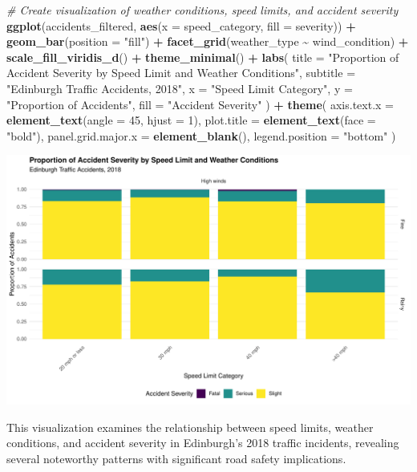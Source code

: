 \documentclass[
]{article}
\newenvironment{Shaded}{\begin{snugshade}}{\end{snugshade}}
\newcommand{\AttributeTok}[1]{\textcolor[rgb]{0.13,0.29,0.53}{#1}}
\newcommand{\CommentTok}[1]{\textcolor[rgb]{0.56,0.35,0.01}{\textit{#1}}}
\newcommand{\DecValTok}[1]{\textcolor[rgb]{0.00,0.00,0.81}{#1}}
\newcommand{\FunctionTok}[1]{\textcolor[rgb]{0.13,0.29,0.53}{\textbf{#1}}}
\newcommand{\NormalTok}[1]{#1}
\newcommand{\SpecialCharTok}[1]{\textcolor[rgb]{0.81,0.36,0.00}{\textbf{#1}}}
\newcommand{\StringTok}[1]{\textcolor[rgb]{0.31,0.60,0.02}{#1}}
\begin{document}
\begin{Shaded}
\begin{Highlighting}[]
\CommentTok{\# Create visualization of weather conditions, speed limits, and accident severity}
\FunctionTok{ggplot}\NormalTok{(accidents\_filtered, }\FunctionTok{aes}\NormalTok{(}\AttributeTok{x =}\NormalTok{ speed\_category, }\AttributeTok{fill =}\NormalTok{ severity)) }\SpecialCharTok{+}
  \FunctionTok{geom\_bar}\NormalTok{(}\AttributeTok{position =} \StringTok{"fill"}\NormalTok{) }\SpecialCharTok{+}
  \FunctionTok{facet\_grid}\NormalTok{(weather\_type }\SpecialCharTok{\textasciitilde{}}\NormalTok{ wind\_condition) }\SpecialCharTok{+}
  \FunctionTok{scale\_fill\_viridis\_d}\NormalTok{() }\SpecialCharTok{+}
  \FunctionTok{theme\_minimal}\NormalTok{() }\SpecialCharTok{+}
  \FunctionTok{labs}\NormalTok{(}
    \AttributeTok{title =} \StringTok{"Proportion of Accident Severity by Speed Limit and Weather Conditions"}\NormalTok{,}
    \AttributeTok{subtitle =} \StringTok{"Edinburgh Traffic Accidents, 2018"}\NormalTok{,}
    \AttributeTok{x =} \StringTok{"Speed Limit Category"}\NormalTok{,}
    \AttributeTok{y =} \StringTok{"Proportion of Accidents"}\NormalTok{,}
    \AttributeTok{fill =} \StringTok{"Accident Severity"}
\NormalTok{  ) }\SpecialCharTok{+}
  \FunctionTok{theme}\NormalTok{(}
    \AttributeTok{axis.text.x =} \FunctionTok{element\_text}\NormalTok{(}\AttributeTok{angle =} \DecValTok{45}\NormalTok{, }\AttributeTok{hjust =} \DecValTok{1}\NormalTok{),}
    \AttributeTok{plot.title =} \FunctionTok{element\_text}\NormalTok{(}\AttributeTok{face =} \StringTok{"bold"}\NormalTok{),}
    \AttributeTok{panel.grid.major.x =} \FunctionTok{element\_blank}\NormalTok{(),}
    \AttributeTok{legend.position =} \StringTok{"bottom"}
\NormalTok{  )}
\end{Highlighting}
\end{Shaded}

\includegraphics[width=0.8\linewidth]{hw-03-accidents_files/figure-latex/weather_speed_severity-1}

This visualization examines the relationship between speed limits,
weather conditions, and accident severity in Edinburgh's 2018 traffic
incidents, revealing several noteworthy patterns with significant road
safety implications.
\end{document}
